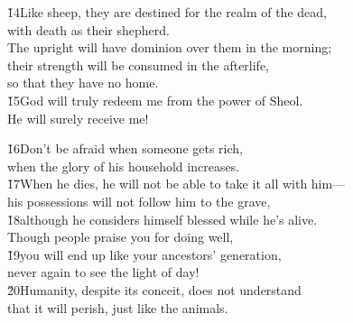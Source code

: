 
\begin{poetry}
\poeml \v{14}Like sheep, they are destined for the realm of the dead, \\
\poemll    with death as their shepherd. \\
\poeml The upright will have dominion over them in the morning; \\
\poemll    their strength will be consumed in the afterlife, \\
\poemlll       so that they have no home. \\
\poeml \v{15}God will truly redeem me from the power of Sheol. \\
\poemll    He will surely receive me!
\end{poetry}

\begin{poetry}
\poeml \v{16}Don't be afraid when someone gets rich, \\
\poemll    when the glory of his household increases. \\
\poeml \v{17}When he dies, he will not be able to take it all with him--- \\
\poemll    his possessions will not follow him to the grave, \\
\poeml \v{18}although he considers himself blessed while he's alive. \\
\poeml Though people praise you for doing well, \\
\poeml \v{19}you will end up like your ancestors' generation, \\
\poemlll       never again to see the light of day! \\
\poeml \v{20}Humanity, despite its conceit, does not understand \\
\poemll    that it will perish, just like the animals.
\end{poetry}

